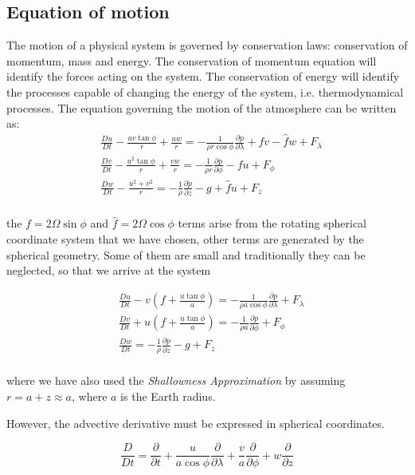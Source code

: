 \subsection{Equation of motion} %
The motion of a physical system is governed by conservation laws: conservation of momentum, mass and energy. The conservation of momentum equation will identify the forces acting on the system. The conservation of energy will identify the processes capable of changing the energy of the system, i.e. thermodynamical processes.
The equation governing the motion of the atmosphere can be written as:
\[
\begin{aligned}
&\frac{D u}{Dt} -\frac{uv \tan{\phi}}{r} +  \frac{uw}{r} = -\frac{1}{\rho r \cos{\phi}}\frac{\partial p}{\partial \lambda} + fv - \hat{f}w + F_\lambda\\
&\frac{D v}{Dt} -\frac{u^2 \tan{\phi}}{r} +  \frac{vw}{r} = -\frac{1}{\rho r }\frac{\partial p}{\partial \phi} - fu  + F_\phi\\
&\frac{D w}{Dt} -\frac{u^2+v^2}{r} = -\frac{1}{\rho }\frac{\partial p}{\partial z} -g +\hat{f}u + F_z\\
\end{aligned}\]

the \(f=2\Omega \sin{\phi}\) and \(\hat{f} = 2\Omega\cos{\phi}\) terms arise from the rotating spherical coordinate system that we have chosen, other terms are generated by the spherical geometry. Some of them are small and traditionally they can be neglected, so that we arrive at the system

\[\begin{aligned}
&\frac{D u}{Dt} - v\left(f +  \frac{u \tan{\phi}}{a}\right)  = -\frac{1}{\rho a \cos{\phi}}\frac{\partial p}{\partial \lambda}   + F_\lambda\\
&\frac{D v}{Dt} + u\left( f + \frac{u \tan{\phi}}{a}\right)  = -\frac{1}{\rho a}\frac{\partial p}{\partial \phi}  + F_\phi\\
&\frac{D w}{Dt}  = -\frac{1}{\rho }\frac{\partial p}{\partial z} -g  + F_z\\
\end{aligned}\]

where we have also used the \emph{Shallowness Approximation} by assuming \(r = a +z \approx a\), where \(a\) is the Earth radius.

However, the advective derivative must be expressed in spherical coordinates.

\[\frac{D }{Dt} = \frac{\partial }{\partial t} + \frac{u}{a\cos{\phi}}\frac{\partial }{\partial \lambda} +\frac{v}{a}\frac{\partial }{\partial \phi} + w\frac{\partial }{\partial z}\]


